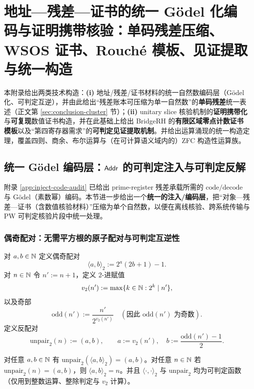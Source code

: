 \section[统一编码与证明携带核验]{地址—残差—证书的统一 Gödel 化编码与证明携带核验：单码残差压缩、WSOS 证书、Rouché 模板、见证提取与统一构造}\label{app:godel-wsos-rouche}

本附录给出两类技术构造：\textbf{(i)} 地址/残差/证书材料的统一自然数编码层（Gödel 化、可判定互逆），并由此给出“残差账本可压缩为单一自然数”的\textbf{单码残差}统一表述（正文第 \ref{sec:conclusion-cluster} 节）；\textbf{(ii)} unitary slice 核验机制的\textbf{证明携带化}与\textbf{可复现}数值证书构造，并在此基础上给出 BridgeRH 的\textbf{有限区域零点计数证书模板}以及“第四寄存器需求”的\textbf{可判定见证提取机制}。并给出运算涌现的统一构造定理，覆盖四则、商余、布尔运算与（在可计算语义域内的）ZFC 构造性运算族。

\subsection{统一 Gödel 编码层：\texorpdfstring{$\mathsf{Addr}$}{Addr} 的可判定注入与可判定反解}\label{app:godel-addr-enc}

附录 \ref{app:inject-code-audit} 已给出 prime-register 残差承载所需的 $\mathrm{code}/\mathrm{decode}$ 与 Gödel（素数幂）编码。本节进一步给出一个\textbf{统一的注入/编码层}，把“对象—残差—证书（含数值核验材料）”压缩为单个自然数，以便在离线核验、跨系统传输与 PW 可判定核验片段中统一处理。

\subsubsection{偶奇配对：无需平方根的原子配对与可判定互逆性}

\begin{definition}[偶奇配对与反配对]\label{def:eo-pair}
对 $a,b\in\mathbb{N}$ 定义偶奇配对
$$
\langle a,b\rangle_{2}:=2^a(2b+1)-1.
$$
对 $n\in\mathbb{N}$ 令 $n':=n+1$，定义 $2$-进赋值
$$
v_2(n'):=\max\{k\in\mathbb{N}:2^k\mid n'\},
$$
以及奇部
$$
\mathrm{odd}(n'):=\frac{n'}{2^{v_2(n')}}\quad(\text{因此 $\mathrm{odd}(n')$ 为奇数}).
$$
定义反配对
$$
\mathrm{unpair}_{2}(n):=(a,b),\qquad a:=v_2(n'),\quad b:=\frac{\mathrm{odd}(n')-1}{2}.
$$
\end{definition}

\begin{lemma}[可判定互逆性]\label{lem:eo-pair-invertible}
对任意 $a,b\in\mathbb{N}$ 有 $\mathrm{unpair}_2(\langle a,b\rangle_2)=(a,b)$。对任意 $n\in\mathbb{N}$ 若 $\mathrm{unpair}_2(n)=(a,b)$，则 $\langle a,b\rangle_2=n$。并且 $\langle\cdot,\cdot\rangle_2$ 与 $\mathrm{unpair}_2$ 均为可判定函数（仅用到整数运算、整除判定与 $v_2$ 计算）。
\end{lemma}

